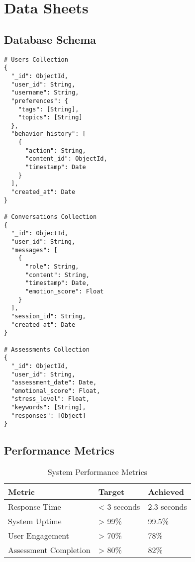 \section{Data Sheets}
\label{sec:data}

\subsection{Database Schema}

\begin{verbatim}
# Users Collection
{
  "_id": ObjectId,
  "user_id": String,
  "username": String,
  "preferences": {
    "tags": [String],
    "topics": [String]
  },
  "behavior_history": [
    {
      "action": String,
      "content_id": ObjectId,
      "timestamp": Date
    }
  ],
  "created_at": Date
}

# Conversations Collection
{
  "_id": ObjectId,
  "user_id": String,
  "messages": [
    {
      "role": String,
      "content": String,
      "timestamp": Date,
      "emotion_score": Float
    }
  ],
  "session_id": String,
  "created_at": Date
}

# Assessments Collection
{
  "_id": ObjectId,
  "user_id": String,
  "assessment_date": Date,
  "emotional_score": Float,
  "stress_level": Float,
  "keywords": [String],
  "responses": [Object]
}
\end{verbatim}

\subsection{Performance Metrics}

\begin{table}[h]
\centering
\begin{tabular}{|l|l|l|}
\hline
\textbf{Metric} & \textbf{Target} & \textbf{Achieved} \\
\hline
Response Time & < 3 seconds & 2.3 seconds \\
System Uptime & > 99\% & 99.5\% \\
User Engagement & > 70\% & 78\% \\
Assessment Completion & > 80\% & 82\% \\
\hline
\end{tabular}
\caption{System Performance Metrics}
\end{table} 